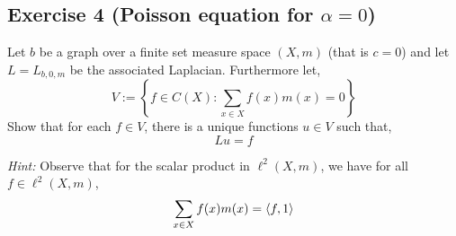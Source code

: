 \subsection{Exercise 4 (Poisson equation for \texorpdfstring{$\alpha=0$)})}
Let $b$ be a graph over a finite set measure space $(X,m)$ (that is $c=0$) and let $L=L_{b,0,m}$ be the associated Laplacian. Furthermore let,
\begin{equation*}
	V:=\left\{f\in C(X)\colon \sum_{x\in X}f(x)m(x) = 0\right\}
\end{equation*}
Show that for each $f\in V$, there is a unique functions $u\in V$ such that,
\begin{equation*}
	Lu = f
\end{equation*}

\textit{Hint:} Observe that for the scalar product in $\ell^{2}(X,m)$, we have for all $f\in\ell^{2}(X,m)$,
\begin{equation*}
	\sum_{x\in X}f(x)m(x) = \braket{f,1}
\end{equation*}

